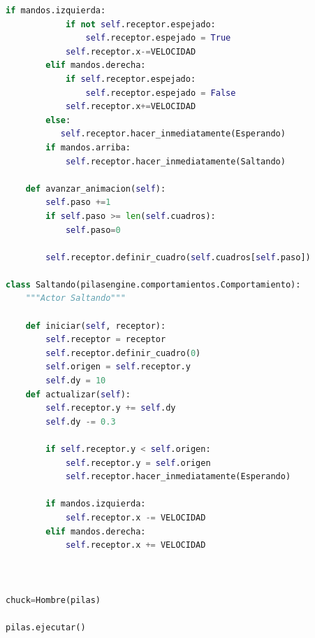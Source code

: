 \documentclass{article}
\begin{document}
\begin{lstlisting}[language=Python]
        if mandos.izquierda:
            if not self.receptor.espejado:
                self.receptor.espejado = True
            self.receptor.x-=VELOCIDAD
        elif mandos.derecha:
            if self.receptor.espejado:
                self.receptor.espejado = False
            self.receptor.x+=VELOCIDAD
        else:
           self.receptor.hacer_inmediatamente(Esperando)
        if mandos.arriba:
            self.receptor.hacer_inmediatamente(Saltando)
    
    def avanzar_animacion(self):
        self.paso +=1
        if self.paso >= len(self.cuadros):
            self.paso=0
        
        self.receptor.definir_cuadro(self.cuadros[self.paso])

class Saltando(pilasengine.comportamientos.Comportamiento):
    """Actor Saltando"""
    
    def iniciar(self, receptor):
        self.receptor = receptor
        self.receptor.definir_cuadro(0)
        self.origen = self.receptor.y
        self.dy = 10 
    def actualizar(self):
        self.receptor.y += self.dy
        self.dy -= 0.3
    
        if self.receptor.y < self.origen:
            self.receptor.y = self.origen
            self.receptor.hacer_inmediatamente(Esperando)
    
        if mandos.izquierda:
            self.receptor.x -= VELOCIDAD
        elif mandos.derecha:
            self.receptor.x += VELOCIDAD
                
            
        
chuck=Hombre(pilas)

pilas.ejecutar()

\end{lstlisting}
\vspace{\baselineskip}
\end{document}
